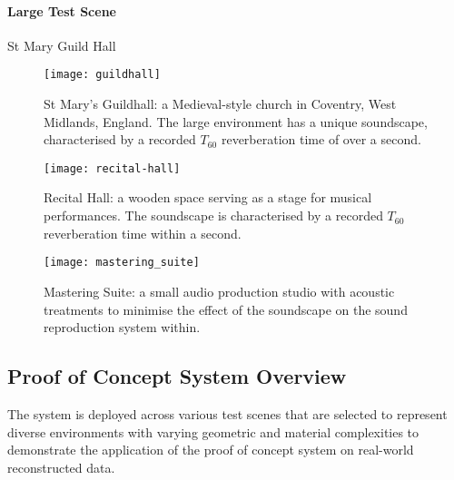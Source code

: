 \paragraph{Large Test Scene}
St Mary Guild Hall

\begin{figure}[htbp]
    \centering
    \texttt{[image: guildhall]}
    \caption[Proof of concept demonstration --- large environment]{St Mary's Guildhall: a Medieval-style church in Coventry, West Midlands, England. The large environment has a unique soundscape, characterised by a recorded $T_{60}$ reverberation time of over a second.}
    \label{fig:guildhall-iso-render}
\end{figure}

\begin{figure}[htbp]
    \centering
    \texttt{[image: recital-hall]}
    \caption[Proof of concept demonstration --- medium environment]{Recital Hall: a wooden space serving as a stage for musical performances. The soundscape is characterised by a recorded $T_{60}$ reverberation time within a second.}
    \label{fig:conservatoire-iso-render}
\end{figure}

\begin{figure}[htbp]
    \centering
    \texttt{[image: mastering\_suite]}
    \caption[Proof of concept demonstration --- small environment]{Mastering Suite: a small audio production studio with acoustic treatments to minimise the effect of the soundscape on the sound reproduction system within.}
    \label{fig:mastering-iso-render}
\end{figure}




\subsection{Proof of Concept System Overview}
The system is deployed across various test scenes that are selected to represent diverse environments with varying geometric and material complexities to demonstrate the application of the proof of concept system on real-world reconstructed data.


